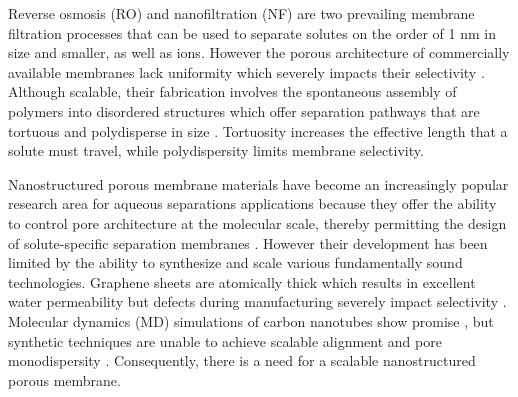 \documentclass[journal=jpcbfk,manuscript=article]{achemso}
\begin{document}

  Reverse osmosis (RO) and nanofiltration (NF) are two prevailing membrane
  filtration processes that can be used to separate solutes on the order of 1 nm
  in size and smaller, as well as ions. However the porous architecture of
  commercially 
  available 
  membranes lack uniformity which severely impacts their
  selectivity \cite{van_der_bruggen_review_2003}. Although scalable, their
  fabrication involves the spontaneous assembly of polymers into disordered
  structures which offer separation pathways that are tortuous and polydisperse
  in size \cite{werber_materials_2016}. Tortuosity increases the effective
  length that a solute must travel, while polydispersity limits membrane
  selectivity.

  Nanostructured porous membrane materials have become 
  an increasingly popular research area for
  aqueous separations applications because they offer the ability to control pore
  architecture at the molecular scale, thereby permitting the design of
  solute-specific separation membranes \cite{humplik_nanostructured_2011}.
  However their development has been limited by the ability to synthesize and
  scale 
  various fundamentally sound technologies. Graphene sheets are atomically
  thick which results in excellent water permeability but defects during
  manufacturing severely impact selectivity \cite{cohen-tanugi_multilayer_2016}.
  Molecular dynamics (MD) simulations of carbon nanotubes show promise
  \cite{humplik_nanostructured_2011}, but synthetic techniques are unable to
  achieve scalable alignment and pore monodispersity
  \cite{hata_water-assisted_2004,maruyama_growth_2005}. Consequently, there is a
  need for a scalable nanostructured porous membrane. 
\end{document}
